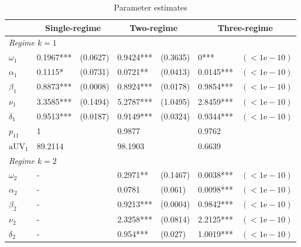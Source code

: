 \documentclass[12pt,a4paper]{article}
\begin{document}
\begin{table}[tb]
\small
\center
\begin{threeparttable}
\caption{Parameter estimates}
\label{table:params_ml}
\begin{tabular}{lllllll}
\hline
               & \multicolumn{2}{c}{Single-regime} & \multicolumn{2}{c}{Two-regime} & \multicolumn{2}{c}{Three-regime} \\ \hline
\multicolumn{6}{l}{\textit{Regime $k=1$}}                                                        &                     \\
$\omega_1$     & 0.1967***        & (0.0627)       & 0.9424***      & (0.3635)      & 0***       & $(<1\mathrm{e}-10)$ \\
$\alpha_1$     & 0.1115*          & (0.0731)       & 0.0721**       & (0.0413)      & 0.0145***  & $(<1\mathrm{e}-10)$ \\
$\beta_1$      & 0.8873***        & (0.0008)       & 0.8924***      & (0.0178)      & 0.9854***  & $(<1\mathrm{e}-10)$ \\
$\nu_1$        & 3.3585***        & (0.1494)       & 5.2787***      & (1.0495)      & 2.8459***  & $(<1\mathrm{e}-10)$ \\
$\delta_1$     & 0.9513***        & (0.0187)       & 0.9149***      & (0.0324)      & 0.9344***  & $(<1\mathrm{e}-10)$ \\
$p_11$         & 1                &                & 0.9877         &               & 0.9762     &                     \\
$\text{aUV}_1$ & 89.2114          &                & 98.1903        &               & 0.6639     &                     \\ \hline
\multicolumn{6}{l}{\textit{Regime $k=2$}}                                                        &                     \\
$\omega_2$     & -                &                & 0.2971**       & (0.1467)      & 0.0038***  & $(<1\mathrm{e}-10)$ \\
$\alpha_2$     & -                &                & 0.0781         & (0.061)       & 0.0098***  & $(<1\mathrm{e}-10)$ \\
$\beta_2$      & -                &                & 0.9213***      & (0.0004)      & 0.9842***  & $(<1\mathrm{e}-10)$ \\
$\nu_2$        & -                &                & 2.3258***      & (0.0814)      & 2.2125***  & $(<1\mathrm{e}-10)$ \\
$\delta_2$     & -                &                & 0.954***       & (0.027)       & 1.0019***  & $(<1\mathrm{e}-10)$ \\

\end{tabular}
\end{threeparttable}
\end{table}
\end{document}
